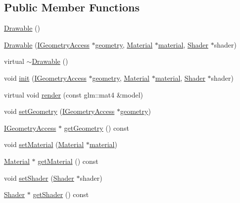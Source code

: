\subsection*{Public Member Functions}
\begin{DoxyCompactItemize}
\item 
\mbox{\hyperlink{classec_1_1_drawable_adb3c4e7b4d3d510489a26b3d1a8094a2}{Drawable}} ()
\item 
\mbox{\hyperlink{classec_1_1_drawable_a1a6fee8a6543e001ee2943bda72e17cd}{Drawable}} (\mbox{\hyperlink{classec_1_1_i_geometry_access}{I\+Geometry\+Access}} $\ast$\mbox{\hyperlink{namespaceec_ae4420ccd0f79418a5ce075e43909289faed7daeb157cd9b31e53896ad3c771a26}{geometry}}, \mbox{\hyperlink{classec_1_1_material}{Material}} $\ast$\mbox{\hyperlink{namespaceec_ae4420ccd0f79418a5ce075e43909289faeec34d804c9ce6c89cff596be555e6a4}{material}}, \mbox{\hyperlink{classec_1_1_shader}{Shader}} $\ast$shader)
\item 
virtual \mbox{\hyperlink{classec_1_1_drawable_a4a82e5cd6d6a47ad86ed42cfdda512d8}{$\sim$\+Drawable}} ()
\item 
void \mbox{\hyperlink{classec_1_1_drawable_ac494c72b1b0396dbe25a822da4e328a9}{init}} (\mbox{\hyperlink{classec_1_1_i_geometry_access}{I\+Geometry\+Access}} $\ast$\mbox{\hyperlink{namespaceec_ae4420ccd0f79418a5ce075e43909289faed7daeb157cd9b31e53896ad3c771a26}{geometry}}, \mbox{\hyperlink{classec_1_1_material}{Material}} $\ast$\mbox{\hyperlink{namespaceec_ae4420ccd0f79418a5ce075e43909289faeec34d804c9ce6c89cff596be555e6a4}{material}}, \mbox{\hyperlink{classec_1_1_shader}{Shader}} $\ast$shader)
\item 
virtual void \mbox{\hyperlink{classec_1_1_drawable_ac9d3345bd308fce8c99adbfc12c53106}{render}} (const glm\+::mat4 \&model)
\item 
void \mbox{\hyperlink{classec_1_1_drawable_a76bcb843ef5ced898724fa79a9b20250}{set\+Geometry}} (\mbox{\hyperlink{classec_1_1_i_geometry_access}{I\+Geometry\+Access}} $\ast$\mbox{\hyperlink{namespaceec_ae4420ccd0f79418a5ce075e43909289faed7daeb157cd9b31e53896ad3c771a26}{geometry}})
\item 
\mbox{\hyperlink{classec_1_1_i_geometry_access}{I\+Geometry\+Access}} $\ast$ \mbox{\hyperlink{classec_1_1_drawable_a49a90aac40736ff3c182196c2b86c2f3}{get\+Geometry}} () const
\item 
void \mbox{\hyperlink{classec_1_1_drawable_a0fc7868639a83830d4b60dfad85a0826}{set\+Material}} (\mbox{\hyperlink{classec_1_1_material}{Material}} $\ast$\mbox{\hyperlink{namespaceec_ae4420ccd0f79418a5ce075e43909289faeec34d804c9ce6c89cff596be555e6a4}{material}})
\item 
\mbox{\hyperlink{classec_1_1_material}{Material}} $\ast$ \mbox{\hyperlink{classec_1_1_drawable_ac74210aca5428bedbf8af7abe9adbcc1}{get\+Material}} () const
\item 
void \mbox{\hyperlink{classec_1_1_drawable_a413f373bb2cba109497377e18b084048}{set\+Shader}} (\mbox{\hyperlink{classec_1_1_shader}{Shader}} $\ast$shader)
\item 
\mbox{\hyperlink{classec_1_1_shader}{Shader}} $\ast$ \mbox{\hyperlink{classec_1_1_drawable_a7de4c8aa937bda1009c6428ceeb541c1}{get\+Shader}} () const
\end{DoxyCompactItemize}
